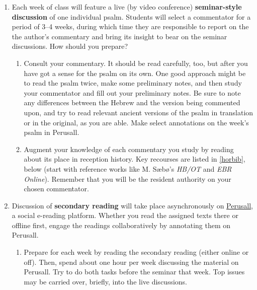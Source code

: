 \documentclass[titlepage]{article}
\begin{document}
\begin{enumerate}

	\item Each week of class will feature a live (by video conference)
	\textbf{seminar-style discussion} of one individual psalm. Students
	will select a commentator for a period of 3--4 weeks, during which
	time they are responsible to report on the the author's commentary
	and bring its insight to bear on the seminar discussions. How should
	you prepare?

	\begin{enumerate}

l
		\item Consult your commentary. It should be read carefully, too,
		but after you have got a sense for the psalm on its own. One
		good approach might be to read the psalm twice, make some
		preliminary notes, and then study your commentator and fill out
		your preliminary notes. Be sure to note any differences between
		the Hebrew and the version being commented upon, and try to read
		relevant ancient versions of the psalm in translation or in the
		original, as you are able. Make select annotations on the week's
		psalm in Perusall.

		\item Augment your knowledge of each commentary you study by
		reading about its place in reception history. Key recourses are
		listed in \autoref{horbib}, below (start with reference works
		like M. Sæbø's \emph{HB/OT} and \emph{EBR Online}). Remember
		that you will be the resident authority on your chosen
		commentator.

	\end{enumerate}


	\item Discussion of \textbf{secondary reading} will take place
	asynchronously on \href{https://app.perusall.com/}{Perusall}, a
	social e-reading platform. Whether you read the assigned texts there
	or offline first, engage the readings collaboratively by annotating
	them on Perusall.

	\begin{enumerate}

		\item Prepare for each week by reading the secondary reading
		(either online or off). Then, spend about one hour per week
		discussing the material on Perusall. Try to do both tasks before
		the seminar that week. Top issues may be carried over, briefly,
		into the live discussions.


\end{enumerate}
\end{enumerate}
\end{document}
